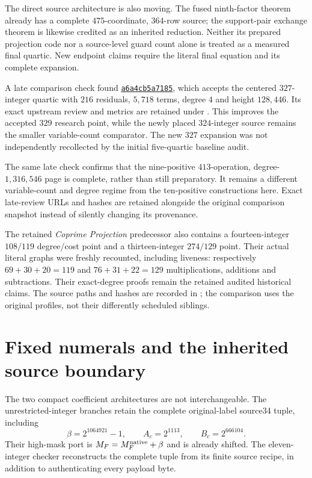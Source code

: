 \documentclass[11pt]{article}
\begin{document}
The direct source architecture is also moving. The fused ninth-factor theorem
already has a complete $475$-coordinate, $364$-row source; the support-pair
exchange theorem is likewise credited as an inherited reduction.
Neither its prepared projection code nor a source-level guard count alone
is treated as a measured final quartic. New endpoint claims require the
literal final equation and its complete expansion.


A late comparison check found
\href{https://github.com/VladimirReshetnikov/ProveIt/commit/a6a4cb5a7185f9c5c736c0cc04b7bb892a1fa5ca}{\texttt{a6a4cb5a7185}},
which accepts the centered $327$-integer quartic with $216$ residuals,
$5,718$ terms, degree $4$ and height $128,446$. Its exact upstream review
and metrics are retained under . This improves the
accepted $329$ research point, while the newly placed $324$-integer source
remains the smaller variable-count comparator. The new $327$ expansion was
not independently recollected by the initial five-quartic baseline audit.

The same late check confirms that the nine-positive $413$-operation,
degree-$1,316,546$ page is complete, rather than still preparatory.
It remains a different variable-count and degree regime from the ten-positive
constructions here. Exact late-review URLs and hashes are retained alongside
the original comparison snapshot instead of silently changing its provenance.


The retained \emph{Coprime Projection} predecessor also contains a
fourteen-integer $108/119$ degree/cost point and a thirteen-integer $274/129$
point. Their actual literal graphs were freshly recounted, including liveness:
respectively $69+30+20=119$ and $76+31+22=129$ multiplications, additions
and subtractions. Their exact-degree proofs remain the retained audited
historical claims. The source paths and hashes are recorded in
; the comparison uses the
original  profiles, not their differently scheduled siblings.
\section{Fixed numerals and the inherited source boundary}
The two compact coefficient architectures are not interchangeable.
The unrestricted-integer branches retain the complete original-label source34
tuple, including
\[
 \beta=2^{1064921}-1,\qquad A_c=2^{1113},\qquad B_c=2^{666104}.
\]
Their high-mask port is $M_F=M_F^{\rm native}+\beta$ and is already shifted.
The eleven-integer checker reconstructs the complete tuple from its finite
source recipe, in addition to authenticating every payload byte.
\end{document}
